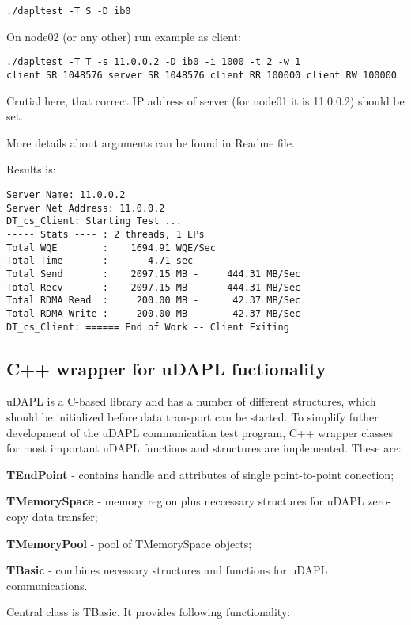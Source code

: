{\tt ./dapltest -T S -D ib0}

On node02 (or any other) run example as client:

{\tt ./dapltest -T T -s 11.0.0.2 -D ib0 -i 1000 -t 2 -w 1 \\
client SR 1048576 server SR 1048576 client RR 100000 client RW 100000}

Crutial here, that correct IP address of server (for node01 it is 11.0.0.2) should be set.

More details about arguments can be found in Readme file.

Results is:
\begin{verbatim}
Server Name: 11.0.0.2
Server Net Address: 11.0.0.2
DT_cs_Client: Starting Test ...
----- Stats ---- : 2 threads, 1 EPs
Total WQE        :    1694.91 WQE/Sec
Total Time       :       4.71 sec
Total Send       :    2097.15 MB -     444.31 MB/Sec
Total Recv       :    2097.15 MB -     444.31 MB/Sec
Total RDMA Read  :     200.00 MB -      42.37 MB/Sec
Total RDMA Write :     200.00 MB -      42.37 MB/Sec
DT_cs_Client: ====== End of Work -- Client Exiting 
\end{verbatim}

\subsection{C++ wrapper for uDAPL fuctionality}
\label{uDAPL-cpp}

uDAPL is a C-based library and has a number of different structures, which should be initialized before 
data transport can be started. To simplify futher development of the uDAPL communication test program, 
 C++ wrapper classes for most important uDAPL functions and structures are implemented. These are:

\begin{compactitem}[$\bullet$]
 \item {\bf TEndPoint} - contains handle and attributes of single point-to-point conection; 
 \item {\bf TMemorySpace} - memory region plus neccessary structures for uDAPL zero-copy data transfer; 
 \item {\bf TMemoryPool} - pool of TMemorySpace objects;
 \item {\bf TBasic} - combines necessary structures and functions for uDAPL communications.
\end{compactitem} 

Central class is TBasic. It provides following functionality:

